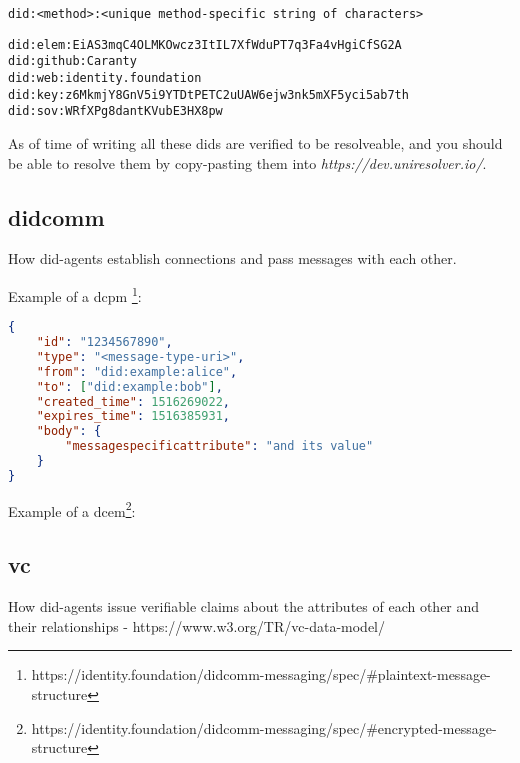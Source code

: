 \begin{lstlisting}[caption={DID-signature}]
did:<method>:<unique method-specific string of characters>
\end{lstlisting}

\begin{lstlisting}[caption={Depending on the DID-method, different DIDs may look very different from each other.}]
did:elem:EiAS3mqC4OLMKOwcz3ItIL7XfWduPT7q3Fa4vHgiCfSG2A
did:github:Caranty
did:web:identity.foundation
did:key:z6MkmjY8GnV5i9YTDtPETC2uUAW6ejw3nk5mXF5yci5ab7th
did:sov:WRfXPg8dantKVubE3HX8pw

\end{lstlisting}

As of time of writing all these \acrshort{dids} are verified to be resolveable, and you should be able to resolve them by copy-pasting them into \textit{https://dev.uniresolver.io/\cite{UniversalResolver}}.

\newpage




\subsection{\acrfull{didcomm}}

How \acrshort{did}-agents establish connections and pass messages with each other.


Example of a \acrfull{dcpm} \footnote{https://identity.foundation/didcomm-messaging/spec/\#plaintext-message-structure}:
\begin{lstlisting}[language=json]
{
    "id": "1234567890",
    "type": "<message-type-uri>",
    "from": "did:example:alice",
    "to": ["did:example:bob"],
    "created_time": 1516269022,
    "expires_time": 1516385931,
    "body": {
    	"messagespecificattribute": "and its value"
    }
}
\end{lstlisting}

Example of a \acrfull{dcem}\footnote{https://identity.foundation/didcomm-messaging/spec/\#encrypted-message-structure}:
\newpage




\subsection{\acrfull{vc}} 

How \acrshort{did}-agents issue verifiable claims about the attributes of each other and their relationships - https://www.w3.org/TR/vc-data-model/ 

